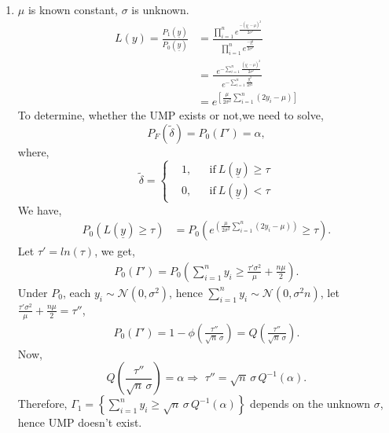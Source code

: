 \documentclass[a4paper,english,12pt]{article}
\begin{document}
\begin{enumerate}[label=(\alph*).]
\item {$\mu$ is known constant, $\sigma$ is unknown.}
\begin{align*}
L(y)=\frac{P_1(\underline{y})}{P_0(\underline{y})}&=\frac{\prod\limits_{i=1}^{n} e^{\frac{-(y_i - \mu)^2}{2 \sigma^2}}}{ \prod\limits_{i=1}^{n} e^{\frac{-y_i^2}{2 \sigma^2}}}\\
&=\frac{\,\,\, e^{-\sum\limits_{i=1}^n \frac{(y_i - \mu)^2}{2 \sigma^2}}}{\, e^{-\sum\limits_{i=1}^n\frac{y_i^2}{2 \sigma^2}}}\\
&=e^{\left[\frac{\mu}{2 \sigma^2}\sum\limits_{i=1}^n(2y_i-\mu)\right]}
\end{align*}
To determine, whether the UMP exists or not,we need to solve,
\begin{equation}
P_F(\tilde{\delta})=P_0(\Gamma')=\alpha,
\end{equation}
where,
 \begin{equation}
\tilde{\delta}= \left \{
  \begin{aligned}
    &1, && \text{if}\ L(\underline{y})\geq\tau \\
    &0, && \text{if}\ L(\underline{y})<\tau 
  \end{aligned} \right.
\end{equation}
We have,
\begin{align*}
P_0(L(\underline{y})\geq\tau)&=P_0 (e^{\left( \frac{\mu}{2 \sigma^2}\sum\limits_{i=1}^n(2y_i-\mu)\right)} \geq \tau).
\end{align*}
Let $\tau' =ln(\tau)$, we get,
\begin{align*}
P_0(\Gamma')=P_0 \left(\sum\limits_{i=1}^n y_i\geq\frac{\tau' \sigma^2}{\mu}+\frac{n\mu}{2}\right).
\end{align*}
Under $P_0$, each $y_i \sim \mathcal{N}(0,\sigma^2)$, hence $\sum\limits_{i=1}^ny_i \sim \mathcal{N}(0,\sigma^2 n)$, let $\frac{\tau \prime \sigma^2}{\mu}+\frac{n\mu}{2}=\tau''$,
\begin{align*}
P_0(\Gamma')=1-\phi\left(\frac{\tau''}{\sqrt{n}\, \sigma}\right)=Q\left(\frac{\tau''}{\sqrt{n}\, \sigma}\right).
\end{align*}
Now,
\begin{equation*}
Q\left(\frac{\tau''}{\sqrt{n}\, \sigma}\right)=\alpha\Rightarrow \,\, \tau''=\sqrt{n}\,\sigma \, Q^{-1}(\alpha).
\end{equation*}
Therefore, $\Gamma_1=\left \{ \sum\limits_{i=1}^n y_i\geq \sqrt{n}\,\sigma \, Q^{-1}(\alpha) \right \}$ depends on the unknown $\sigma$, hence UMP doesn't exist.

\end{enumerate}
\end{document}
